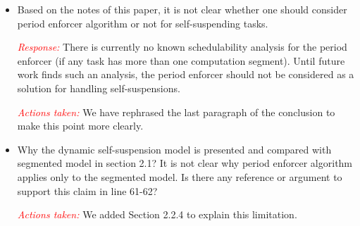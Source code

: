 \documentclass[12pt]{article}
\newenvironment{response}[0]{\textcolor{red}{\emph{Response: }}\color{blue}}{\medskip}
\newcommand{\action}[1]{\textcolor{red}{\emph{\it Actions taken: }}{\color{blue}#1}\medskip}
\begin{document}
\begin{itemize}
	\item 
Based on the notes of this paper, it is not clear whether one should consider period enforcer algorithm or not for self-suspending tasks.

\begin{response}
	There is currently no known schedulability analysis for the period enforcer (if any task has more than one computation segment).  Until future work finds such an analysis, the period enforcer should not be considered as a solution for handling self-suspensions.
\end{response}

\action{We have rephrased the last paragraph of the conclusion to make this point more clearly.}


	\item    
Why the dynamic self-suspension model is presented and compared with
segmented model in section 2.1? It is not clear why period enforcer
algorithm applies only to the segmented model. Is there any reference or
argument to support this claim in line 61-62?

\action{We added Section 2.2.4 to explain this limitation.}
\end{itemize}
\end{document}
